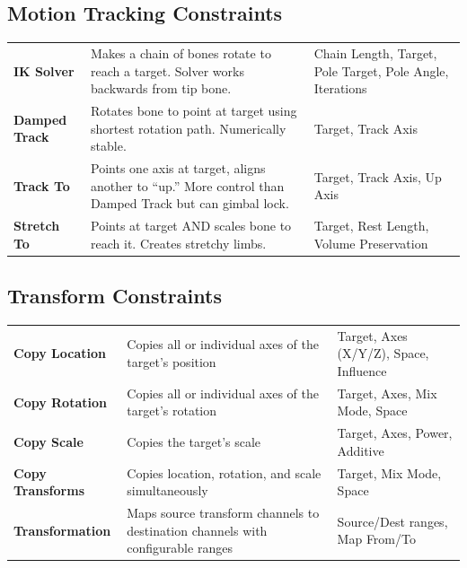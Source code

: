 \subsection{Motion Tracking Constraints}

\begin{center}
\begin{tabularx}{\textwidth}{L{2.5cm}L{4cm}X}
\toprule
{}
 &  &  \\
\midrule
\textbf{IK Solver} & Makes a chain of bones rotate to reach a target. Solver works backwards from tip bone. & Chain Length, Target, Pole Target, Pole Angle, Iterations \\
\textbf{Damped Track} & Rotates bone to point at target using shortest rotation path. Numerically stable. & Target, Track Axis \\
\textbf{Track To} & Points one axis at target, aligns another to ``up.'' More control than Damped Track but can gimbal lock. & Target, Track Axis, Up Axis \\
\textbf{Stretch To} & Points at target AND scales bone to reach it. Creates stretchy limbs. & Target, Rest Length, Volume Preservation \\
\bottomrule
\end{tabularx}
\end{center}

\subsection{Transform Constraints}

\begin{center}
\begin{tabularx}{\textwidth}{L{2.8cm}L{4cm}X}
\toprule
{}
 &  &  \\
\midrule
\textbf{Copy Location} & Copies all or individual axes of the target's position & Target, Axes (X/Y/Z), Space, Influence \\
\textbf{Copy Rotation} & Copies all or individual axes of the target's rotation & Target, Axes, Mix Mode, Space \\
\textbf{Copy Scale} & Copies the target's scale & Target, Axes, Power, Additive \\
\textbf{Copy Transforms} & Copies location, rotation, and scale simultaneously & Target, Mix Mode, Space \\
\textbf{Transformation} & Maps source transform channels to destination channels with configurable ranges & Source/Dest ranges, Map From/To \\
\bottomrule
\end{tabularx}
\end{center}


